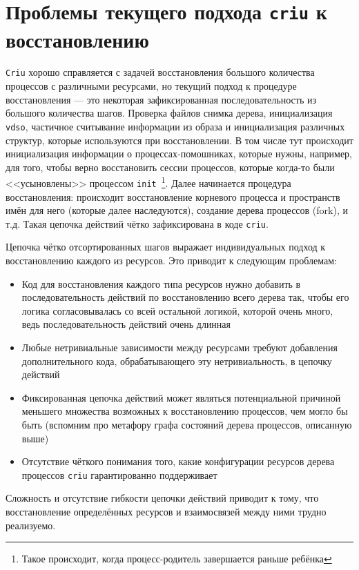\section{Проблемы текущего подхода \texttt{criu} к восстановлению}
\label{chap1:sec:problems}

\texttt{Criu} хорошо справляется с задачей восстановления большого количества процессов с различными ресурсами, но
текущий подход к процедуре восстановления --- это некоторая зафиксированная последовательность из большого количества шагов. Проверка файлов снимка дерева, инициализация \texttt{vdso}, частичное считывание информации из образа и инициализация различных структур, которые используются при восстановлении. В том числе тут происходит инициализация информации о процессах-помошниках, которые нужны, например, для того, чтобы верно восстановить сессии процессов, которые когда-то были <<усыновлены>> процессом \texttt{init}~\footnote{Такое происходит, когда процесс-родитель завершается раньше ребёнка}. Далее начинается процедура восстановления: происходит восстановление корневого процесса и пространств имён для него (которые далее наследуются), создание дерева процессов (fork), и т.д. Такая цепочка действий чётко зафиксирована в коде \texttt{criu}.

Цепочка чётко отсортированных шагов выражает индивидуальных подход к восстановлению каждого из ресурсов. Это приводит к следующим проблемам:

\begin{itemize}
    \item Код для восстановления каждого типа ресурсов нужно добавить в последовательность действий по восстановлению всего дерева так, чтобы его логика согласовывалась со всей остальной логикой, которой очень много, ведь последовательность действий очень длинная
    \item Любые нетривиальные зависимости между ресурсами требуют добавления дополнительного кода, обрабатывающего эту нетривиальность, в цепочку действий
    \item Фиксированная цепочка действий может являться потенциальной причиной меньшего множества возможных к восстановлению процессов, чем могло бы быть (вспомним про метафору графа состояний дерева процессов, описанную выше)
    \item Отсутствие чёткого понимания того, какие конфигурации ресурсов дерева процессов \texttt{criu} гарантированно поддерживает
\end{itemize}

Сложность и отсутствие гибкости цепочки действий приводит к тому, что восстановление определённых ресурсов и взаимосвязей между ними трудно реализуемо. 

